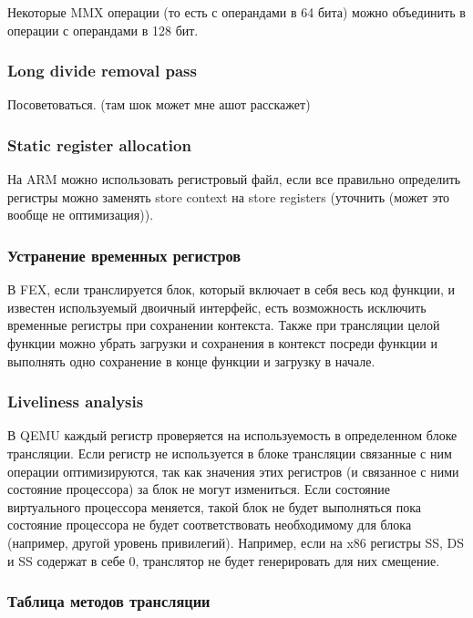 Некоторые MMX операции (то есть с операндами в 64 бита) можно объединить в операции с операндами в 128 бит.

\subsubsection{Long divide removal pass}

Посоветоваться. (там шок может мне ашот расскажет)

\subsubsection{Static register allocation}

На ARM можно использовать регистровый файл, если все правильно определить регистры можно заменять store context на store registers (уточнить (может это вообще не оптимизация)).

\subsubsection{Устранение временных регистров}

В FEX, если транслируется блок, который включает в себя весь код функции, и известен используемый двоичный интерфейс, есть возможность исключить временные регистры при сохранении контекста. Также при трансляции целой функции можно убрать загрузки и сохранения в контекст посреди функции и выполнять одно сохранение в конце функции и загрузку в начале.

\subsubsection{Liveliness analysis}

В QEMU каждый регистр проверяется на используемость в определенном блоке трансляции. Если регистр не используется в блоке трансляции связанные с ним операции оптимизируются, так как значения этих регистров (и связанное с ними состояние процессора) за блок не могут измениться. Если состояние виртуального процессора меняется, такой блок не будет выполняться пока состояние процессора не будет соответствовать необходимому для блока (например, другой уровень привилегий). Например, если на x86 регистры SS, DS и SS содержат в себе 0, транслятор не будет генерировать для них смещение.

\subsubsection{Таблица методов трансляции}

